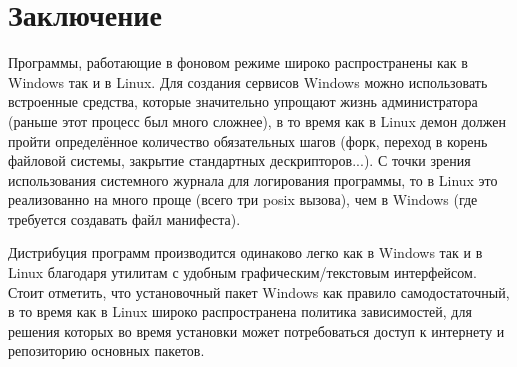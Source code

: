 \section*{Заключение}

Программы, работающие в фоновом режиме широко распространены как в Windows так и в Linux. Для создания сервисов Windows можно использовать встроенные средства, которые значительно упрощают жизнь администратора (раньше этот процесс был много сложнее), в то время как в Linux демон должен пройти определённое количество обязательных шагов (форк, переход в корень файловой системы, закрытие стандартных дескрипторов...). С точки зрения использования системного журнала для логирования программы, то в Linux это реализованно на много проще (всего три posix вызова), чем в Windows (где требуется создавать файл манифеста).

Дистрибуция программ производится одинаково легко как в Windows так и в Linux благодаря утилитам с удобным графическим/текстовым интерфейсом. Стоит отметить, что установочный пакет Windows как правило самодостаточный, в то время как в Linux широко распространена политика зависимостей, для решения которых во время установки может потребоваться доступ к интернету и репозиторию основных пакетов.
